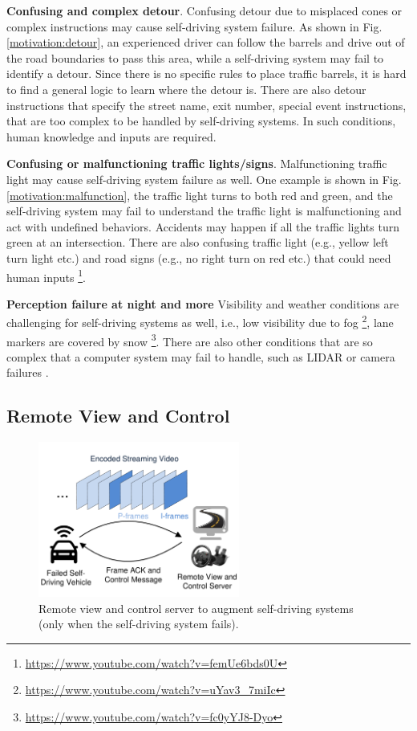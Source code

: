 \textbf{Confusing and complex detour}.
Confusing detour due to misplaced cones or complex instructions 
may cause self-driving system failure. 
As shown in Fig. \ref{motivation:detour}, an experienced driver
can follow the barrels and drive out of the road boundaries
to pass this area, while a self-driving system may 
fail to identify a detour. 
Since there is no specific rules to place
traffic barrels, it is hard to find a general logic to 
learn where the detour is. 
There are also detour instructions that specify the street
name, exit number, special event instructions, 
that are too complex to be handled
by self-driving systems.
In such conditions, human knowledge and inputs are required. 

\textbf{Confusing or malfunctioning traffic lights/signs}.
Malfunctioning traffic light may cause self-driving
system failure as well. 
One example is shown in Fig. \ref{motivation:malfunction}, 
the traffic light turns to both red and green, 
and the self-driving system may fail to understand 
the traffic light is malfunctioning and act
with undefined behaviors.
Accidents may happen if all the traffic lights turn green at
an intersection.  
There are also confusing traffic light (e.g., yellow left turn light etc.)
and road signs (e.g., no right turn on red etc.) that
could need human inputs
\footnote{\url{https://www.youtube.com/watch?v=femUe6bds0U}}. 



\textbf{Perception failure at night and more}
Visibility and weather conditions are challenging for self-driving 
systems as well, 
i.e., low visibility due to fog \footnote{\url{https://www.youtube.com/watch?v=uYav3_7miIc}},
lane markers are covered by snow
\footnote{\url{https://www.youtube.com/watch?v=fc0yYJ8-Dyo}}.
There are also other conditions that are so complex
that a computer system may fail to handle, such as 
LIDAR or camera failures \cite{waymo}.


\subsection{Remote View and Control}


\begin{figure}[t]
\centering
\vspace{-0.2cm}
\includegraphics[width=2.6in,angle=0]{Figs/RTDrive/illustration.pdf}
\vspace{-0.4cm}
\caption{Remote view and control server to augment self-driving systems
(only when the self-driving system fails).}
\vspace{-0.4cm}
\label{illustration}
\centering
\end{figure}

